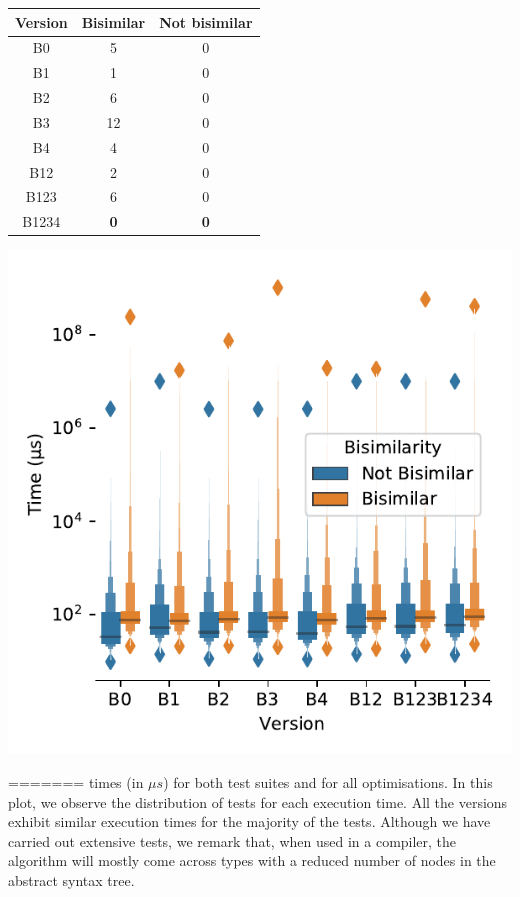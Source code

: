 \noindent
\begin{minipage}[b]{0.49\textwidth}
   {\small 
  \centering
 	\begin{tabular}{ |c|c|c| }
	 \hline
 		Version &  {\color{orange}Bisimilar} & {\color{MidnightBlue}Not bisimilar}  \\ 
 		 \hline
	 	B0 & 5 & 0 \\  
	 	B1 &  1 & 0 \\ 
	 	B2 & 6 & 0 \\ 
	 	B3 &  12 & 0 \\
	 	B4 &  4 & 0 \\
	 	B12 &  2 & 0 \\   
	 	B123 &  6 & 0 \\
	 	B1234 &  \textbf{0} & \textbf{0} \\ 
	 	 \hline  
	\end{tabular}\vspace*{6mm}
	}
	\end{minipage}
	\hfill
\begin{minipage}[b]{0.49\textwidth}
 {\small 
\centering
    \includegraphics[height=.85\textwidth]{img/distribution_boxplot}%
    }
\end{minipage}
=======
times (in $\mu s$) for both test suites and for all optimisations. 
In this plot, we observe the distribution of tests for each execution time.
All the versions exhibit similar execution times for the majority 
of the tests.
Although we have carried out extensive tests, we remark that, when used 
in a compiler, the algorithm will mostly come across types with a reduced 
number of nodes in the abstract syntax tree.

